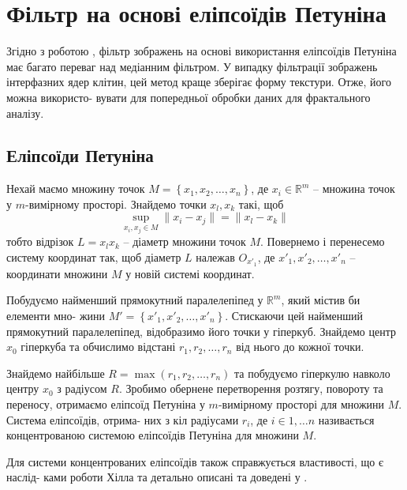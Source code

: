
\section{Фільтр на основі еліпсоїдів Петуніна}

Згідно з роботою \parencite{bib:petuninfilter}, фільтр зображень на основі використання еліпсоїдів Петуніна має багато переваг над медіанним фільтром. У випадку фільтрації зображень інтерфазних ядер клітин, цей метод краще зберігає форму текстури. Отже, його можна використо- вувати для попередньої обробки даних для фрактального аналізу.

\subsection{Еліпсоїди Петуніна}

Нехай маємо множину точок \(M = \left\{x_1, x_2, \dots, x_n\right\}\), де \(x_i \in \mathbb{R}^m\) -- множина точок у \(m\)-вимірному просторі. Знайдемо точки \(x_l, x_k\) такі, щоб
\begin{equation*}
\sup_{x_i, x_j \in M}{\|x_i - x_j\|} = \|x_l - x_k\|
\end{equation*}
тобто відрізок \(L = x_l x_k\) -- діаметр множини точок \(M\). Повернемо і перенесемо систему координат так, щоб діаметр \(L\) належав \(O_{x'_1}\), де \(x'_1, x'_2, \dots, x'_n\) -- координати множини \(M\) у новій системі координат. 

Побудуємо найменший прямокутний паралелепіпед у \(\mathbb{R}^m\), який містив би елементи мно- жини \(M' = \left\{x'_1, x'_2, \dots, x'_n\right\}\). Стискаючи цей найменший прямокутний паралелепіпед, відобразимо його точки у гіперкуб. Знайдемо центр \(x_0\) гіперкуба та обчислимо відстані \(r_1, r_2, \dots, r_n\) від нього до кожної точки. 

Знайдемо найбільше \(R = \max{(r_1, r_2, \dots, r_n)}\) та побудуємо гіперкулю навколо центру \(x_0\) з радіусом \(R\). Зробимо обернене перетворення розтягу, повороту та переносу, отримаємо еліпсоїд Петуніна у \(m\)-вимірному просторі для множини \(M\). Система еліпсоїдів, отрима- них з кіл радіусами \(r_i\), де \(i \in 1, \dots n\) називається концентрованою системою еліпсоїдів Петуніна для множини \(M\).

Для системи концентрованих еліпсоїдів також справжується властивості, що є наслід- ками роботи Хілла \citep{bib:hill} та детально описані та доведені у \citep{bib:lyashko}.

